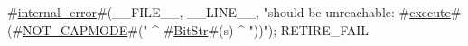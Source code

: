 #\hyperref[sailRISCVzinternalzyerror]{internal\_error}#(__FILE__, __LINE__, "should be unreachable: #\hyperref[sailRISCVzexecute]{execute}#(#\hyperref[sailRISCVzNOTzyCAPMODE]{NOT\_CAPMODE}#(" ^ #\hyperref[sailRISCVzBitStr]{BitStr}#(s) ^ "))");
RETIRE_FAIL

